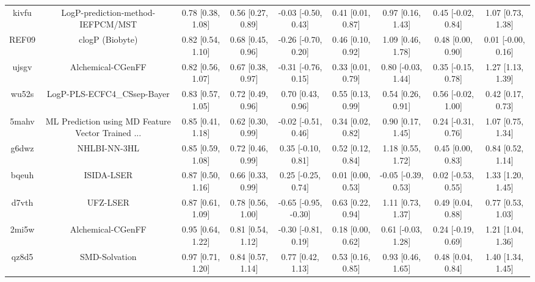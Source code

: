 \documentclass{article}
\begin{document}
\begin{center}
\begin{longtable}{|ccccccccc|}
 kivfu &                  LogP-prediction-method-IEFPCM/MST &  0.78 [0.38, 1.08] &  0.56 [0.27, 0.89] &   -0.03 [-0.50, 0.43] &  0.41 [0.01, 0.87] &    0.97 [0.16, 1.43] &   0.45 [-0.02, 0.84] &     1.07 [0.73, 1.38] \\
 REF09 &                                    clogP (Biobyte) &  0.82 [0.54, 1.10] &  0.68 [0.45, 0.96] &   -0.26 [-0.70, 0.20] &  0.46 [0.10, 0.92] &    1.09 [0.46, 1.78] &    0.48 [0.00, 0.90] &    0.01 [-0.00, 0.16] \\
 ujsgv &                                  Alchemical-CGenFF &  0.82 [0.56, 1.07] &  0.67 [0.38, 0.97] &   -0.31 [-0.76, 0.15] &  0.33 [0.01, 0.79] &   0.80 [-0.03, 1.44] &   0.35 [-0.15, 0.78] &     1.27 [1.13, 1.39] \\
 wu52s &                        LogP-PLS-ECFC4\_CSsep-Bayer &  0.83 [0.57, 1.05] &  0.72 [0.49, 0.96] &     0.70 [0.43, 0.96] &  0.55 [0.13, 0.99] &    0.54 [0.26, 0.91] &   0.56 [-0.02, 1.00] &     0.42 [0.17, 0.73] \\
 5mahv &  ML Prediction using MD Feature Vector Trained ... &  0.85 [0.41, 1.18] &  0.62 [0.30, 0.99] &   -0.02 [-0.51, 0.46] &  0.34 [0.02, 0.82] &    0.90 [0.17, 1.45] &   0.24 [-0.31, 0.76] &     1.07 [0.75, 1.34] \\
 g6dwz &                                       NHLBI-NN-3HL &  0.85 [0.59, 1.08] &  0.72 [0.46, 0.99] &    0.35 [-0.10, 0.81] &  0.52 [0.12, 0.84] &    1.18 [0.55, 1.72] &    0.45 [0.00, 0.83] &     0.84 [0.52, 1.14] \\
 bqeuh &                                         ISIDA-LSER &  0.87 [0.50, 1.16] &  0.66 [0.33, 0.99] &    0.25 [-0.25, 0.74] &  0.01 [0.00, 0.53] &  -0.05 [-0.39, 0.53] &   0.02 [-0.53, 0.55] &     1.33 [1.20, 1.45] \\
 d7vth &                                           UFZ-LSER &  0.87 [0.61, 1.09] &  0.78 [0.56, 1.00] &  -0.65 [-0.95, -0.30] &  0.63 [0.22, 0.94] &    1.11 [0.73, 1.37] &    0.49 [0.04, 0.88] &     0.77 [0.53, 1.03] \\
 2mi5w &                                  Alchemical-CGenFF &  0.95 [0.64, 1.22] &  0.81 [0.54, 1.12] &   -0.30 [-0.81, 0.19] &  0.18 [0.00, 0.62] &   0.61 [-0.03, 1.28] &   0.24 [-0.19, 0.69] &     1.21 [1.04, 1.36] \\
 qz8d5 &                                      SMD-Solvation &  0.97 [0.71, 1.20] &  0.84 [0.57, 1.14] &     0.77 [0.42, 1.13] &  0.53 [0.16, 0.85] &    0.93 [0.46, 1.65] &    0.48 [0.04, 0.84] &     1.40 [1.34, 1.45] \\

\end{longtable}
\end{center}
\end{document}
